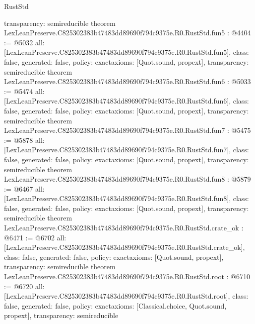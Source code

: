 \begin{lexlean}{RustStd}
\begin{coremodule}
{  transparency: semireducible
}
theorem LexLeanPreserve.C825302383b47483dd89690f794c9375e.R0.RustStd.fun5 : @4404 := @5032 {
  all: [LexLeanPreserve.C825302383b47483dd89690f794c9375e.R0.RustStd.fun5],
  class: false,
  generated: false,
  policy: exact{axioms: [Quot.sound, propext]},
  transparency: semireducible
}
theorem LexLeanPreserve.C825302383b47483dd89690f794c9375e.R0.RustStd.fun6 : @5033 := @5474 {
  all: [LexLeanPreserve.C825302383b47483dd89690f794c9375e.R0.RustStd.fun6],
  class: false,
  generated: false,
  policy: exact{axioms: [Quot.sound, propext]},
  transparency: semireducible
}
theorem LexLeanPreserve.C825302383b47483dd89690f794c9375e.R0.RustStd.fun7 : @5475 := @5878 {
  all: [LexLeanPreserve.C825302383b47483dd89690f794c9375e.R0.RustStd.fun7],
  class: false,
  generated: false,
  policy: exact{axioms: [Quot.sound, propext]},
  transparency: semireducible
}
theorem LexLeanPreserve.C825302383b47483dd89690f794c9375e.R0.RustStd.fun8 : @5879 := @6467 {
  all: [LexLeanPreserve.C825302383b47483dd89690f794c9375e.R0.RustStd.fun8],
  class: false,
  generated: false,
  policy: exact{axioms: [Quot.sound, propext]},
  transparency: semireducible
}
theorem LexLeanPreserve.C825302383b47483dd89690f794c9375e.R0.RustStd.crate_ok : @6471 := @6702 {
  all: [LexLeanPreserve.C825302383b47483dd89690f794c9375e.R0.RustStd.crate_ok],
  class: false,
  generated: false,
  policy: exact{axioms: [Quot.sound, propext]},
  transparency: semireducible
}
theorem LexLeanPreserve.C825302383b47483dd89690f794c9375e.R0.RustStd.root : @6710 := @6720 {
  all: [LexLeanPreserve.C825302383b47483dd89690f794c9375e.R0.RustStd.root],
  class: false,
  generated: false,
  policy: exact{axioms: [Classical.choice, Quot.sound, propext]},
  transparency: semireducible
}


\end{coremodule}
\end{lexlean}
